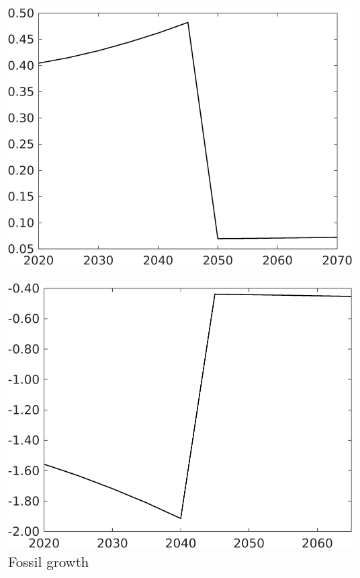 \begin{figure}[h!!!]
\begin{subfigure}[]{0.32\textwidth}
		\includegraphics[width=1\textwidth]{../../codding_model/own_basedOnFried/optimalPol_010922_revision/figures/all_13Sept22_Tplus30/tauf_OPT_COMPtaulPer_regime4_spillover0_knspil1_noskill1_sep0_xgrowth0_PV1_etaa0.79.png}
	\end{subfigure}
	\begin{subfigure}[]{0.32\textwidth}
		\caption{Fossil growth }
		\includegraphics[width=1\textwidth]{../../codding_model/own_basedOnFried/optimalPol_010922_revision/figures/all_13Sept22_Tplus30/gAf_OPT_COMPtaulPer_regime4_spillover0_knspil1_noskill1_sep0_xgrowth0_PV1_etaa0.79.png}
	\end{subfigure}
	\begin{subfigure}[]{0.32\textwidth}

\end{subfigure}
\end{figure}

